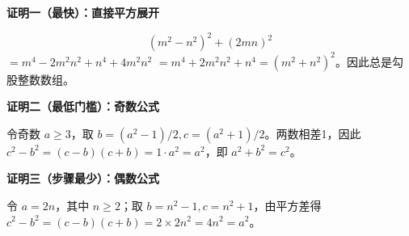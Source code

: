 \clearpage
\begin{proofbox}
\textbf{\textcolor{CProof}{证明一（最快）：直接平方展开}}
\par\medskip
\begin{center}

\end{center}
\medskip
\[(m^2-n^2)^2+(2mn)^2\]$=m^4-2m^2n^2+n^4+4m^2n^2$ $=m^4+2m^2n^2+n^4=(m^2+n^2)^2$。因此总是勾股整数数组。
\end{proofbox}
\clearpage
\begin{proofbox}
\textbf{\textcolor{CProof}{证明二（最低门槛）：奇数公式}}
\par\medskip
\begin{center}

\end{center}
\medskip
令奇数 $a\ge3$，取 $b=(a^2-1)/2,c=(a^2+1)/2$。两数相差1，因此 $c^2-b^2=(c-b)(c+b)=1\cdot a^2=a^2$，即 $a^2+b^2=c^2$。
\end{proofbox}
\clearpage
\begin{proofbox}
\textbf{\textcolor{CProof}{证明三（步骤最少）：偶数公式}}
\par\medskip
\begin{center}

\end{center}
\medskip
令 $a=2n$，其中 $n\ge2$；取 $b=n^2-1,c=n^2+1$，由平方差得 $c^2-b^2=(c-b)(c+b)=2\times2n^2=4n^2=a^2$。
\end{proofbox}
